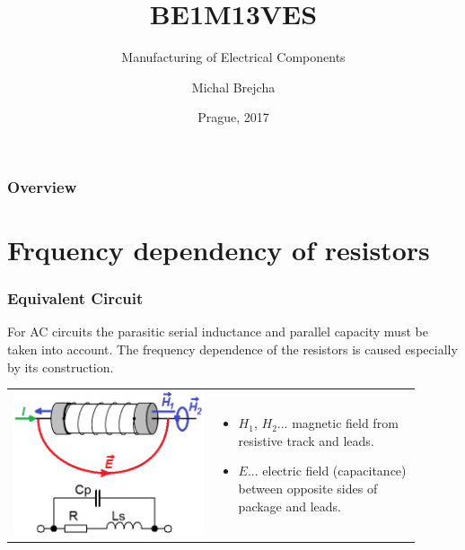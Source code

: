 \documentclass{beamer}
\title[BE1M13VES]{BE1M13VES}
\subtitle[Manufacturing of Electrical Components] {Manufacturing of Electrical Components}
\author[Brejcha]{Michal Brejcha}
\institute[CTU]{CTU in Prague}
\date[Prague, 2017]{Prague, 2017}
\begin{document}
\frame{\titlepage}

\begin{frame}
\frametitle{Overview} 
\tableofcontents
\end{frame}


\section{\texorpdfstring{Frquency dependency of resistors}{Frquency dependency of resistors}}
	\begin{frame}
    \frametitle{Equivalent Circuit}
		
		For AC circuits the parasitic serial inductance and parallel capacity must be taken into account. The frequency dependence of the resistors is caused especially by its construction.
		\begin{center}
			\begin{tabular}{m{0.45\linewidth} m{0.45\linewidth}}
			\includegraphics[scale=0.4]{obr01_poleRes.png} &
			
			\begin{itemize}
				\item $H_1$, $H_2$... magnetic field from resistive track and leads.
				\item $E$... electric field (capacitance) between opposite sides of package and leads.
			\end{itemize}
			\end{tabular}
		\end{center}
	\end{frame}
\end{document}
